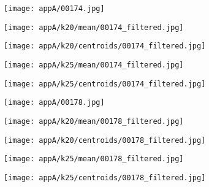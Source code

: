 \documentclass[draft,final]{vutinfth} %
\begin{document}
\begin{appendices}
\begin{figure}[h]
\centering
  \begin{subfigure}[t]{0.19\columnwidth}
    \centering
    \texttt{[image: appA/00174.jpg]}
  \end{subfigure}
  \begin{subfigure}[t]{0.19\columnwidth}
    \centering
    \texttt{[image: appA/k20/mean/00174\_filtered.jpg]}
  \end{subfigure}
  \begin{subfigure}[t]{0.19\columnwidth}
    \centering
    \texttt{[image: appA/k20/centroids/00174\_filtered.jpg]}
  \end{subfigure}
  \begin{subfigure}[t]{0.19\columnwidth}
    \centering
    \texttt{[image: appA/k25/mean/00174\_filtered.jpg]}
  \end{subfigure}
  \begin{subfigure}[t]{0.19\columnwidth}
    \centering
    \texttt{[image: appA/k25/centroids/00174\_filtered.jpg]}
  \end{subfigure}
\caption{}
\end{figure}  

\begin{figure}[h]
\centering
  \begin{subfigure}[t]{0.19\columnwidth}
    \centering
    \texttt{[image: appA/00178.jpg]}
  \end{subfigure}
  \begin{subfigure}[t]{0.19\columnwidth}
    \centering
    \texttt{[image: appA/k20/mean/00178\_filtered.jpg]}
  \end{subfigure}
  \begin{subfigure}[t]{0.19\columnwidth}
    \centering
    \texttt{[image: appA/k20/centroids/00178\_filtered.jpg]}
  \end{subfigure}
  \begin{subfigure}[t]{0.19\columnwidth}
    \centering
    \texttt{[image: appA/k25/mean/00178\_filtered.jpg]}
  \end{subfigure}
  \begin{subfigure}[t]{0.19\columnwidth}
    \centering
    \texttt{[image: appA/k25/centroids/00178\_filtered.jpg]}
  \end{subfigure}
\caption{}
\end{figure}  


\end{appendices}
\end{document}
